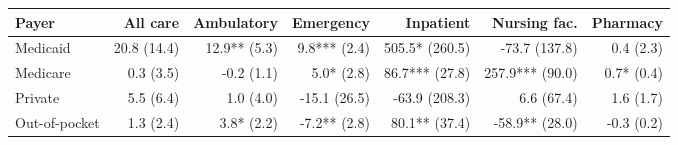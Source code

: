 \begin{tabular}{@{}l rrrrrr@{}}
\toprule
Payer & All care & Ambulatory & Emergency & Inpatient & Nursing fac. & Pharmacy \\
\midrule
Medicaid & 20.8 (14.4) & 12.9** (5.3) & 9.8*** (2.4) & 505.5* (260.5) & -73.7 (137.8) & 0.4 (2.3) \\
Medicare & 0.3 (3.5) & -0.2 (1.1) & 5.0* (2.8) & 86.7*** (27.8) & 257.9*** (90.0) & 0.7* (0.4) \\
Private & 5.5 (6.4) & 1.0 (4.0) & -15.1 (26.5) & -63.9 (208.3) & 6.6 (67.4) & 1.6 (1.7) \\
Out-of-pocket & 1.3 (2.4) & 3.8* (2.2) & -7.2** (2.8) & 80.1** (37.4) & -58.9** (28.0) & -0.3 (0.2) \\
\bottomrule
\end{tabular}
